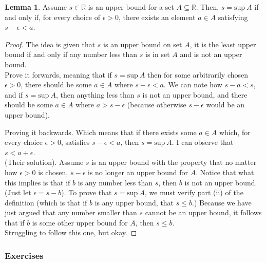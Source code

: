 \documentclass{article}
\numberwithin{equation}{subsection}
\theoremstyle{definition}
\newtheorem{lemma}{Lemma}
\begin{document}
\begin{lemma} 
    Assume $s \in \mathbb{R}$ is an upper bound for a set $A \subseteq \mathbb{R}$. Then,
    $s = \text{sup}~A$ if and only if, for every choice of $\epsilon > 0$, there exists an
    element $a \in A$ satisfying $s - \epsilon < a$.

    \begin{proof}
       The idea is given that $s$ is an upper bound on set $A$, it is the least upper
       bound if and only if any number less than $s$ is in set $A$ and is not an upper
       bound.\\

       Prove it forwards, meaning that if $s = \text{sup}~A$ then for some arbitrarily
       chosen $\epsilon > 0$, there should be some $a \in A$ where $s - \epsilon < a$. We
       can note how $s - a < s$, and if $s = \text{sup}~A$, then anything less than $s$ is
       not an upper bound, and there should be some $a \in A$ where $a > s - \epsilon$
       (because otherwise $s - \epsilon$ would be an upper bound).

       Proving it backwards. Which means that if there exists some $a \in A$ which, for every
       choice $\epsilon > 0$, satisfies $s - \epsilon < a$, then $s = \text{sup}~A$. I can
       observe that $s < a + \epsilon$.\\

       (Their solution). Assume $s$ is an upper bound with the property that no matter how
       $\epsilon > 0$ is chosen, $s - \epsilon$ is no longer an upper bound for $A$.
       Notice that what this implies is that if $b$ is any number less than $s$, then $b$
       is not an upper bound. (Just let $\epsilon = s - b$). To prove that $s =
       \text{sup}~A$, we must verify part (ii) of the definition (which is that if $b$ is
       any upper bound, that $s \leq b$.) Because we have just argued that any number
       smaller than $s$ cannot be an upper bound, it follows that if $b$ is some other
       upper bound for $A$, then $s \leq b$.\\

       Struggling to follow this one, but okay.

    \end{proof}
\end{lemma}

\subsubsection*{Exercises}
\end{document}
